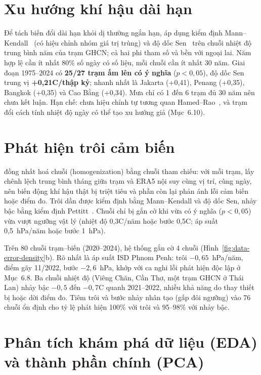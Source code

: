 \documentclass[12pt,a4paper]{report}
\begin{document}
\section{Xu hướng khí hậu dài hạn}

Để tách biến đổi dài hạn khỏi dị thường ngắn hạn,  áp dụng kiểm định
Mann--Kendall~\cite{mann1945nonparametric,kendall1975rank} (có hiệu chỉnh nhóm giá trị trùng) và độ dốc
Sen~\cite{sen1968estimates} trên chuỗi nhiệt độ trung bình năm của trạm GHCN; cả hai phi tham số và bền
với ngoại lai. Năm hợp lệ cần ít nhất 80\% số ngày có số liệu, mỗi chuỗi cần ít nhất 30 năm. Giai đoạn
1975--2024 có \textbf{25/27 trạm ấm lên có ý nghĩa} ($p < 0{,}05$), độ dốc Sen trung vị
\textbf{+0,21\textdegree{}C/thập kỷ}; nhanh nhất là Jakarta (+0,41), Penang (+0,35), Bangkok (+0,35) và Cao
Bằng (+0,34). Mưa chỉ có 1 đến 6 trạm đủ 30 năm nên chưa kết luận. Hạn chế: chưa hiệu chỉnh tự tương quan
Hamed--Rao~\cite{hamed1998modified}, và trạm đổi cách tính nhiệt độ ngày có thể tạo xu hướng giả (Mục~6.10).

\section{Phát hiện trôi cảm biến}

 đồng nhất hoá chuỗi (homogenization) bằng chuỗi tham chiếu: với mỗi
trạm, lấy chênh lệch trung bình tháng giữa trạm và ERA5 nội suy cùng vị trí, cùng ngày, nên biến động
khí hậu thật bị triệt tiêu và phần còn lại phản ánh lỗi cảm biến hoặc điểm đo. Trôi dần được kiểm định
bằng Mann--Kendall và độ dốc Sen, nhảy bậc bằng kiểm định Pettitt~\cite{pettitt1979nonparametric}. Chuỗi
chỉ bị gắn cờ khi vừa có ý nghĩa ($p < 0{,}05$) vừa vượt ngưỡng vật lý (nhiệt độ 0,3\textdegree{}C/năm
hoặc bước 0,5\textdegree{}C; áp suất 0,5~hPa/năm hoặc bước 1~hPa).

Trên 80 chuỗi trạm--biến (2020--2024), hệ thống gắn cờ 4 chuỗi (Hình~\ref{fig:data-error-density}b).
Rõ nhất là áp suất ISD Phnom Penh: trôi $-0{,}65$~hPa/năm, điểm gãy 11/2022, bước $-2{,}6$~hPa, khớp với
ca nghi lỗi phát hiện độc lập ở Mục~6.8. Ba chuỗi nhiệt độ (Viêng Chăn, Cần Thơ, một trạm GHCN ở Thái
Lan) nhảy bậc $-0{,}5$ đến $-0{,}7$\textdegree{}C quanh 2021--2022, nhiều khả năng do thay thiết bị hoặc
dời điểm đo. Tiêm trôi và bước nhảy nhân tạo (gấp đôi ngưỡng) vào 76 chuỗi ổn định cho tỷ lệ phát hiện
100\% với trôi và 95--98\% với nhảy bậc.

\section{Phân tích khám phá dữ liệu (EDA) và thành phần chính (PCA)}
\label{sec:eda-pca}
\end{document}
